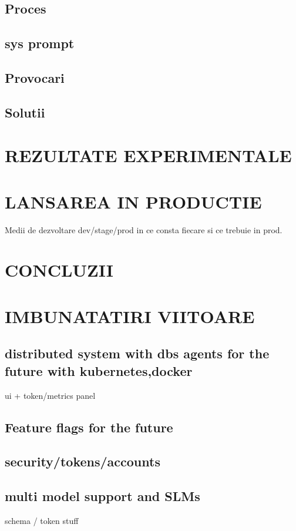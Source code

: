 \documentclass[12pt, a4paper, oneside, romanian, draft]{teza-upb}
\begin{document}
  \section{Proces}
  \section{sys prompt}
  \section{Provocari}
  \section{Solutii}



\chapter{REZULTATE EXPERIMENTALE}

\chapter{LANSAREA IN PRODUCTIE}
Medii de dezvoltare dev/stage/prod in ce consta fiecare si ce trebuie in prod.

\chapter{CONCLUZII}



\chapter{IMBUNATATIRI VIITOARE}

  \section{distributed system with dbs agents for the future with kubernetes,docker}
  ui + token/metrics panel
  \section{Feature flags for the future}
  \section{security/tokens/accounts}
  \section{multi model support and SLMs}
  schema / token stuff
\end{document}
